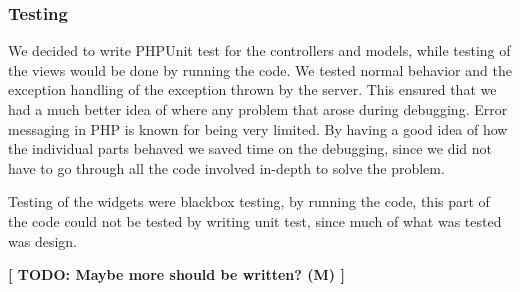 \subsubsection{Testing}
We decided to write PHPUnit test for the controllers and models, while testing of the views would be done by running the code. We tested normal behavior and the exception handling of the exception thrown by the server. This ensured that we had a much better idea of where any problem that arose during debugging. Error messaging in PHP is known for being very limited. By having a good idea of how the individual parts behaved we saved time on the debugging, since we did not have to go through all the code involved in-depth to solve the problem. 

Testing of the widgets were blackbox testing, by running the code, this part of the code could not be tested by writing unit test, since much of what was tested was design.

\textbf{[ TODO: Maybe more should be written? (M) ]}